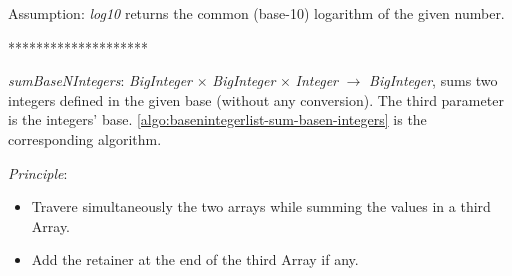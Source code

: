 \documentclass[book, nodocumentinfo]{upmethodology-document}
\newcommand{\separator}{\centerline{********************}}
\begin{document}
Assumption: \emph{log10} returns the common (base-10) logarithm of the given number.

\separator

\emph{sumBaseNIntegers}: \emph{BigInteger} \(×\) \emph{BigInteger} \(×\) \emph{Integer} \(\rightarrow\) \emph{BigInteger},
sums two integers defined in the given base (without any conversion).
The third parameter is the integers' base.
\ref{algo:basenintegerlist-sum-basen-integers} is the corresponding algorithm.

\emph{Principle}:
\begin{itemize}
    \item Travere simultaneously the two arrays while summing the values in a third Array.
    \item Add the retainer at the end of the third Array if any.
\end{itemize}

\newpage
\end{document}
